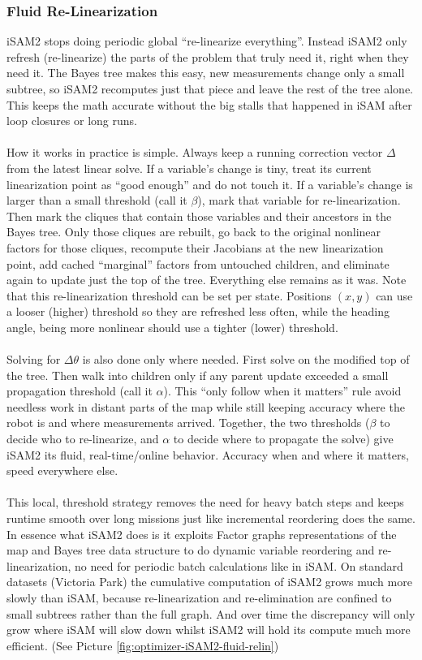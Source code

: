 \subsubsection{Fluid Re-Linearization}
iSAM2 stops doing periodic global ``re-linearize everything''. Instead iSAM2 only refresh (re-linearize) the parts of the problem that truly need it, right when they need it. The Bayes tree makes this easy, new measurements change only a small subtree, so iSAM2 recomputes just that piece and leave the rest of the tree alone. This keeps the math accurate without the big stalls that happened in iSAM after loop closures or long runs. \cite{iSAM2_paper,Bayes_tree_for_SLAM_paper}
\\ \\ 
How it works in practice is simple. Always keep a running correction vector $\Delta$ from the latest linear solve. If a variable's change is tiny, treat its current linearization point as ``good enough'' and do not touch it. If a variable's change is larger than a small threshold (call it $\beta$), mark that variable for re-linearization. Then mark the cliques that contain those variables and their ancestors in the Bayes tree. Only those cliques are rebuilt, go back to the original nonlinear factors for those cliques, recompute their Jacobians at the new linearization point, add cached ``marginal'' factors from untouched children, and eliminate again to update just the top of the tree. Everything else remains as it was. Note that this re-linearization threshold can be set per state. Positions $(x,y)$ can use a looser (higher) threshold so they are refreshed less often, while the heading angle, being more nonlinear should use a tighter (lower) threshold. \cite{Bayes_tree_for_SLAM_paper}
\\ \\
Solving for $\Delta\theta$ is also done only where needed. First solve on the modified top of the tree. Then walk into children only if any parent update exceeded a small propagation threshold (call it $\alpha$). This ``only follow when it matters'' rule avoid needless work in distant parts of the map while still keeping accuracy where the robot is and where measurements arrived. Together, the two thresholds ($\beta$ to decide who to re-linearize, and $\alpha$ to decide where to propagate the solve) give iSAM2 its fluid, real-time/online behavior. Accuracy when and where it matters, speed everywhere else.
\\ \\
This local, threshold strategy removes the need for heavy batch steps and keeps runtime smooth over long missions just like incremental reordering does the same. In essence what iSAM2 does is it exploits Factor graphs representations of the map and Bayes tree data structure to do dynamic variable reordering and re-linearization, no need for periodic batch calculations like in iSAM. On standard datasets (Victoria Park) the cumulative computation of iSAM2 grows much more slowly than iSAM, because re-linearization and re-elimination are confined to small subtrees rather than the full graph. And over time the discrepancy will only grow where iSAM will slow down whilst iSAM2 will hold its compute much more efficient. (See Picture \ref{fig:optimizer-iSAM2-fluid-relin})
